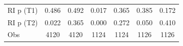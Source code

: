{\begin{tabular}{l*{6}{c}}
RI p (T1)           &       0.486         &       0.492         &       0.017         &       0.365         &       0.385         &       0.172         \\
RI p (T2)           &       0.022         &       0.365         &       0.000         &       0.272         &       0.050         &       0.410         \\
Obs                 &        4120         &        4120         &        1124         &        1124         &        1126         &        1126         \\
\bottomrule
\end{tabular}
}
